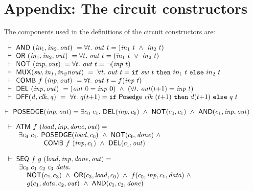 \newpage
\section*{Appendix: The circuit constructors}
\label{CircuitConstructors}
\vspace*{-3mm}

The components used in the definitions of the circuit constructors are:

\smallskip
$
\begin{array}{l}
\TURNST\ \DEF{AND}\ (\sVAR{in}{1},\sVAR{in}{2},\VAR{out}) ~ = 
   \forall t.\ \VAR{out}\ t = (\sVAR{in}{1}\ t\ \AND\ \sVAR{in}{2}\ t)\\
\TURNST\ \DEF{OR}\ (\sVAR{in}{1},\sVAR{in}{2},\VAR{out}) ~ =
   \forall t.\ \VAR{out}\ t = (\sVAR{in}{1}\ t\ \OR\ \sVAR{in}{2}\ t)\\
\TURNST\ \DEF{NOT}\ (\VAR{inp},\VAR{out}) ~ = 
   \forall t.\ \VAR{out}\ t = \NOT(\VAR{inp}\ t)\\
\TURNST\ \DEF{MUX} (\VAR{sw,in_1,in_2nout})~ =~
 \forall t.\ out~t =  \IF{sw~t}{in_1~t}{in_2~t}\\
\TURNST\ \DEF{COMB}\ f\ \VAR{(inp,out)} ~ = \forall t.\ \VAR{out}\ t = f (\VAR{inp}\ t)\\
\TURNST\ \DEF{DEL}\ (\VAR{inp},\VAR{out}) ~ = 
    (\VAR{out}\ 0 = \VAR{inp}\ 0)\ \AND\ 
    (\forall t.\ \VAR{out} (t{+}1) = \VAR{inp}\ t)\\
\TURNST\ \DEF{DFF} (\VAR{d,clk,q})~ =~
 \forall t.\ q (t{+}1) =  \IF{\DEF{Posedge}\ \VAR{clk}\ (t{+}1)}{d (t{+}1)}{q\ t}
\end{array}
$
 

$
\vdash\ \mathsf{POSEDGE} (\mathit{inp},\mathit{out}) = 
    \exists c_0~ c_1.\ \mathsf{DEL} (\mathit{inp},c_0)\ \wedge\
                  \mathsf{NOT} (c_0, c_1)\ \wedge\ \mathsf{AND} (c_1,\mathit{inp},\mathit{out})
$

$
\begin{array}{l}
\TURNST\ \DEF{ATM}\ f\ (\VAR{load,inp,done,out}) =\\
\phantom{\TURNST\ ~~}    \exists c_0~ c_1.\ \DEF{POSEDGE} (\VAR{load}, c_0)\ \AND \ 
\DEF{NOT} (c_0, \VAR{done})\ \AND\\
\phantom{\TURNST\ ~~\exists c_0, c_1.\ }  \DEF{COMB}\ f\ (\VAR{inp},c_1)\ \AND\ \DEF{DEL} (c_1,\VAR{out})
\end{array}
$


$
\begin{array}{l}
\TURNST\ \DEF{SEQ}\ f\ g\ (\VAR{load,inp,done,out}) = \\
\phantom{\TURNST\ ~~} \exists c_0~ c_1~ c_2~ c_3~ \VAR{data}.\\
\phantom{\TURNST\ ~~\exists~}                      \DEF{NOT} (c_2,c_3) \ \AND \ 
                      \DEF{OR} (c_3,\VAR{load},c_0) \ \AND \  f (c_0,\VAR{inp},c_1,\VAR{data}) \ \AND \\
\phantom{\TURNST\ ~~ \exists~} 
        g (c_1,\VAR{data},c_2,\VAR{out})\ \AND\ 
        \DEF{AND} (c_1,c_2,\VAR{done}) 
\end{array}
$

